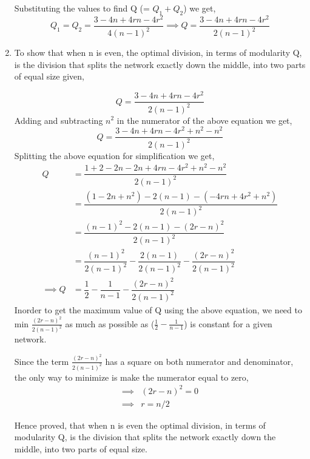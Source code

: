 \documentclass{article}
\begin{document}
\begin{enumerate}[label=(\alph*)]
Substituting the values to find Q (= $Q_1+Q_2$) we get,
$$Q_1 = Q_2 = \dfrac{3-4n+4rn-4r^2}{4(n-1)^2} \implies Q =\dfrac{3-4n+4rn-4r^2}{2(n-1)^2}$$

\item
To show that when n is even, the optimal division, in terms of modularity Q, is the division that splits the network exactly down the middle, into two parts of equal size given,

 $$Q = \dfrac{3-4n+4rn-4r^2}{2(n-1)^2}$$
Adding and subtracting $n^2$ in the numerator of the above equation we get, $$Q = \dfrac{3-4n+4rn-4r^2+n^2-n^2}{2(n-1)^2}$$
Splitting the above equation for simplification we get,
\begin{align*}
Q & = \dfrac{1+2-2n-2n+4rn-4r^2+n^2-n^2}{2(n-1)^2}\\
  & = \dfrac{(1-2n+n^2)-2(n-1)-(-4rn+4r^2+n^2)}{2(n-1)^2}\\
  & = \dfrac{(n-1)^2 - 2(n-1) -(2r-n)^2}{2(n-1)^2}\\
  & = \dfrac{(n-1)^2}{2(n-1)^2}-\dfrac{2(n-1)}{2(n-1)^2}-\dfrac{(2r-n)^2}{2(n-1)^2 }\\
\implies Q & = \dfrac{1}{2} - \dfrac{1}{n-1} - \dfrac{(2r-n)^2}{2(n-1)^2}
\end{align*}
Inorder to get the maximum value of Q using the above equation, we need to min $\frac{(2r-n)^2}{2(n-1)^2}$ as much as possible as ($\frac{1}{2} - \frac{1}{n-1}$) is constant for a given network.

Since the term $\frac{(2r-n)^2}{2(n-1)^2}$ has a square on both numerator and denominator, the only way to minimize is make the numerator equal to zero,
\begin{align*}
\implies & {(2r-n)^2} = 0\\
\implies & r = n/2
\end{align*}

Hence proved, that when n is even the optimal division, in terms of modularity Q, is the division that splits the network exactly down the middle, into two parts of equal size.
\end{enumerate}
\newpage
\end{document}
